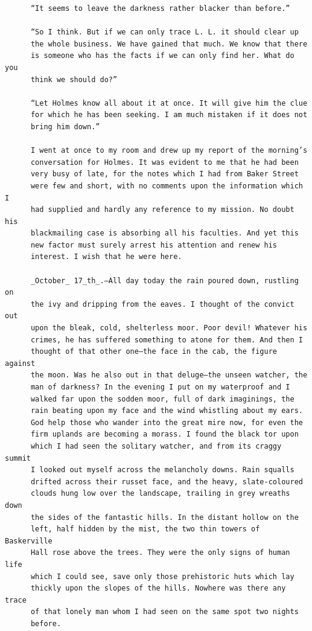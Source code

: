 \documentclass{article}
\begin{document}
\begin{verbatim}
      “It seems to leave the darkness rather blacker than before.”

      “So I think. But if we can only trace L. L. it should clear up
      the whole business. We have gained that much. We know that there
      is someone who has the facts if we can only find her. What do you
      think we should do?”

      “Let Holmes know all about it at once. It will give him the clue
      for which he has been seeking. I am much mistaken if it does not
      bring him down.”

      I went at once to my room and drew up my report of the morning’s
      conversation for Holmes. It was evident to me that he had been
      very busy of late, for the notes which I had from Baker Street
      were few and short, with no comments upon the information which I
      had supplied and hardly any reference to my mission. No doubt his
      blackmailing case is absorbing all his faculties. And yet this
      new factor must surely arrest his attention and renew his
      interest. I wish that he were here.

      _October_ 17_th_.—All day today the rain poured down, rustling on
      the ivy and dripping from the eaves. I thought of the convict out
      upon the bleak, cold, shelterless moor. Poor devil! Whatever his
      crimes, he has suffered something to atone for them. And then I
      thought of that other one—the face in the cab, the figure against
      the moon. Was he also out in that deluge—the unseen watcher, the
      man of darkness? In the evening I put on my waterproof and I
      walked far upon the sodden moor, full of dark imaginings, the
      rain beating upon my face and the wind whistling about my ears.
      God help those who wander into the great mire now, for even the
      firm uplands are becoming a morass. I found the black tor upon
      which I had seen the solitary watcher, and from its craggy summit
      I looked out myself across the melancholy downs. Rain squalls
      drifted across their russet face, and the heavy, slate-coloured
      clouds hung low over the landscape, trailing in grey wreaths down
      the sides of the fantastic hills. In the distant hollow on the
      left, half hidden by the mist, the two thin towers of Baskerville
      Hall rose above the trees. They were the only signs of human life
      which I could see, save only those prehistoric huts which lay
      thickly upon the slopes of the hills. Nowhere was there any trace
      of that lonely man whom I had seen on the same spot two nights
      before.


\end{verbatim}
\end{document}
